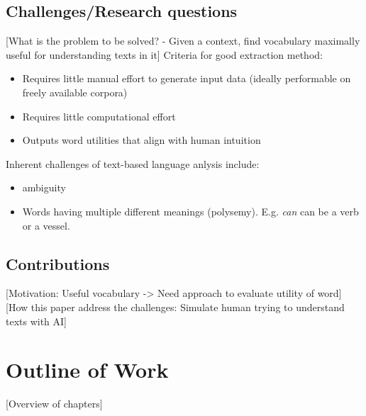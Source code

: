 \subsection{Challenges/Research questions}
[What is the problem to be solved? - Given a context, find vocabulary maximally useful for understanding texts in it]
Criteria for good extraction method:
\begin{itemize}
	\item Requires little manual effort to generate input data (ideally performable on freely available corpora)
	\item Requires little computational effort
	\item Outputs word utilities that align with human intuition 
\end{itemize}

Inherent challenges of text-based language anlysis include:
\begin{itemize}
	\item ambiguity
	\item Words having multiple different meanings (polysemy). E.g. \textit{can} can be a verb or a vessel.
\end{itemize}

\subsection{Contributions}
[Motivation: Useful vocabulary -> Need approach to evaluate utility of word]
[How this paper address the challenges: Simulate human trying to understand texts with AI]

\section{Outline of Work}

[Overview of chapters]
